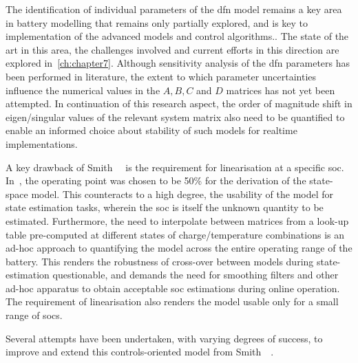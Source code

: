The identification of individual parameters of the \gls{dfn} model remains a key area in battery modelling that remains
only partially explored, and is key to implementation of the advanced models and control algorithms.. The state of the art in this area, the challenges involved and
current efforts in this direction are explored in~\cref{ch:chapter7}. Although sensitivity analysis of the \gls{dfn}
parameters has been performed in literature,  the extent to which parameter uncertainties influence
the numerical values in the $A, B, C$ and $D$ matrices has not yet been attempted. In continuation of this research
aspect, the order of magnitude shift in eigen/singular values of the relevant system matrix also need to be quantified
to enable an informed choice about stability of such models for realtime implementations.

A key drawback of Smith~\etal{}~\cite{Smith007} is the requirement for linearisation at a specific \gls{soc}.
In~\cite{Smith007}, the operating point was chosen to be 50\% for the derivation of the state-space model. This
counteracts to a high degree, the usability of the model for state estimation tasks, wherein the \gls{soc} is itself the
unknown quantity to be estimated. Furthermore, the need to interpolate between matrices from a look-up table
pre-computed at different states of charge/temperature combinations is an ad-hoc approach to quantifying the model
across the entire operating range of the battery. This renders the robustness of cross-over between models during
state-estimation questionable, and demands the need for smoothing filters and other ad-hoc apparatus to obtain
acceptable \gls{soc} estimations during online operation. The requirement of linearisation also renders the model usable
only for a small range of \gls{soc}s.

Several attempts have been undertaken, with varying degrees of success, to improve and extend this controls-oriented
model from Smith~\etal{}~\cite{Smith2007}.









